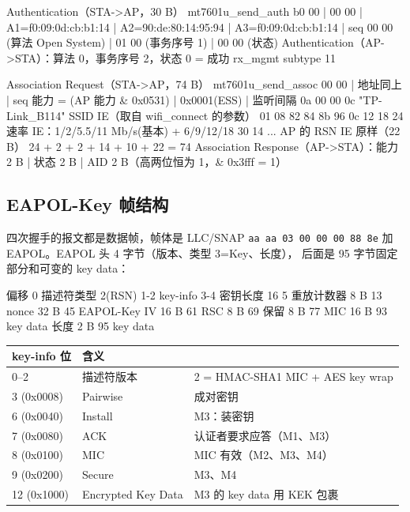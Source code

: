 \documentclass[UTF8,zihao=-4,fontset=none]{ctexart}
\newcommand{\fn}[1]{\texttt{#1}}
\begin{document}
\begin{code}
Authentication（STA->AP，30 B）  mt7601u_send_auth
  b0 00 | 00 00 | A1=f0:09:0d:cb:b1:14 | A2=90:de:80:14:95:94 | A3=f0:09:0d:cb:b1:14 | seq
  00 00 (算法 Open System) | 01 00 (事务序号 1) | 00 00 (状态)
Authentication（AP->STA）：算法 0，事务序号 2，状态 0 = 成功      rx_mgmt subtype 11

Association Request（STA->AP，74 B）  mt7601u_send_assoc
  00 00 | 地址同上 | seq
  能力 = (AP 能力 & 0x0531) | 0x0001(ESS)  | 监听间隔 0a 00
  00 0c "TP-Link_B114"                        SSID IE（取自 wifi_connect 的参数）
  01 08 82 84 8b 96 0c 12 18 24               速率 IE：1/2/5.5/11 Mb/s(基本) + 6/9/12/18
  30 14 ...                                   AP 的 RSN IE 原样（22 B）
  24 + 2 + 2 + 14 + 10 + 22 = 74
Association Response（AP->STA）：能力 2 B | 状态 2 B | AID 2 B（高两位恒为 1，& 0x3fff = 1）
\end{code}

\subsection{EAPOL-Key 帧结构}

四次握手的报文都是数据帧，帧体是 LLC/SNAP \fn{aa aa 03 00 00 00 88 8e} 加 EAPOL。EAPOL 头 4 字节（版本、类型 3=Key、长度），
后面是 95 字节固定部分和可变的 key data：

\begin{code}
偏移  0  描述符类型 2(RSN)   1-2 key-info          3-4 密钥长度 16
      5  重放计数器 8 B      13  nonce 32 B
     45  EAPOL-Key IV 16 B   61  RSC 8 B             69  保留 8 B
     77  MIC 16 B            93  key data 长度 2 B   95  key data
\end{code}

\begin{longtable}{p{18mm}p{40mm}p{90mm}}
\toprule
key-info 位 & 含义 & \\ \midrule \endhead
0--2 & 描述符版本 & 2 = HMAC-SHA1 MIC + AES key wrap \\
3 (0x0008) & Pairwise & 成对密钥 \\
6 (0x0040) & Install & M3：装密钥 \\
7 (0x0080) & ACK & 认证者要求应答（M1、M3） \\
8 (0x0100) & MIC & MIC 有效（M2、M3、M4） \\
9 (0x0200) & Secure & M3、M4 \\
12 (0x1000) & Encrypted Key Data & M3 的 key data 用 KEK 包裹 \\
\bottomrule
\end{longtable}
\end{document}
